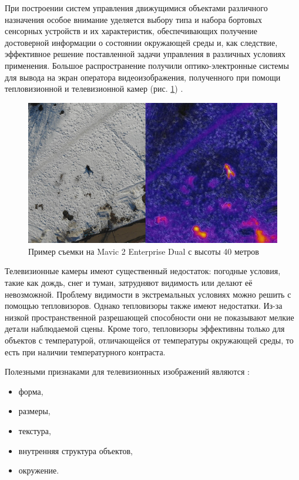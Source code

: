 При построении систем управления движущимися объектами различного назначения особое внимание уделяется выбору типа и набора бортовых сенсорных устройств и их характеристик, обеспечивающих получение достоверной информации о состоянии окружающей среды и, как следствие, эффективное решение поставленной задачи управления в различных условиях применения. Большое распространение получили оптико-электронные системы для вывода на экран оператора видеоизображения, полученного при помощи тепловизионной и телевизионной камер (рис. \ref{teplovision})\cite{bezzubov} .
\begin{figure}[ht!]
    \centering
    \includegraphics[width=0.8\linewidth]{my_folder/images/teplovision.jpeg}
    \caption{Пример съемки на Mavic 2 Enterprise Dual с высоты 40 метров}
    \label{teplovision}
\end{figure}

Телевизионные камеры имеют существенный недостаток: погодные условия, такие как дождь, снег и туман, затрудняют видимость или делают её невозможной. Проблему видимости в экстремальных условиях можно решить с помощью тепловизоров. Однако тепловизоры также имеют недостатки. Из-за низкой пространственной разрешающей способности они не показывают мелкие детали наблюдаемой сцены. Кроме того, тепловизоры эффективны только для объектов с температурой, отличающейся от температуры окружающей среды, то есть при наличии температурного контраста.

Полезными признаками для телевизионных изображений являются \cite{optical-prisnaki}:
\begin{itemize}
    \item форма,
    \item размеры,
    \item текстура,
    \item внутренняя структура объектов,
    \item окружение.
\end{itemize}

